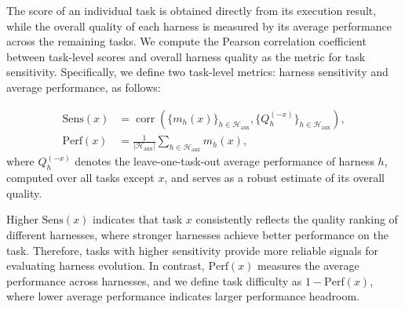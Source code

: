 The score of an individual task is obtained directly from its execution result, while the overall quality of each harness is measured by its average performance across the remaining tasks. We compute the Pearson correlation coefficient between task-level scores and overall harness quality as the metric for task sensitivity. 
Specifically, we define two task-level metrics: harness sensitivity and average performance, as follows:

\begin{equation*}
\begin{aligned}
\mathrm{Sens}(x)
&=
\operatorname{corr}
\left(
\{m_h(x)\}_{h\in\mathcal{H}_{\mathrm{aux}}},
\{Q_h^{(-x)}\}_{h\in\mathcal{H}_{\mathrm{aux}}}
\right),\\
\mathrm{Perf}(x)
&=
\frac{1}{|\mathcal{H}_{\mathrm{aux}}|}
\sum_{h\in\mathcal{H}_{\mathrm{aux}}}m_h(x),
\end{aligned}
\end{equation*}
where $Q_h^{(-x)}$ denotes the leave-one-task-out average performance of harness $h$, computed over all tasks except $x$, and serves as a robust estimate of its overall quality.

Higher $\mathrm{Sens}(x)$ indicates that task $x$ consistently reflects the quality ranking of different harnesses, where stronger harnesses achieve better performance on the task. Therefore, tasks with higher sensitivity provide more reliable signals for evaluating harness evolution. In contrast, $\mathrm{Perf}(x)$ measures the average performance across harnesses, and we define task difficulty as $1-\mathrm{Perf}(x)$, where lower average performance indicates larger performance headroom.


